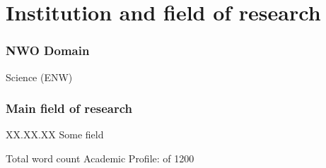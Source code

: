 \documentclass[a4paper,9.5pt,fleqn]{application}
\begin{document}



%




%

\ifdefined\haveScience
\part{Institution and field of research}
\section{NWO Domain}
Science (ENW)

\section{Main field of research}
XX.XX.XX Some field
\fi


\ifdefined\haveProfile
\newpage

\fi

\ifdefined\haveFirstLit
\vspace{1cm}Total word count \thesection{} Academic Profile:  of 1200\\
\fi


\ifdefined\haveOutput
\newpage

\fi
\end{document}
